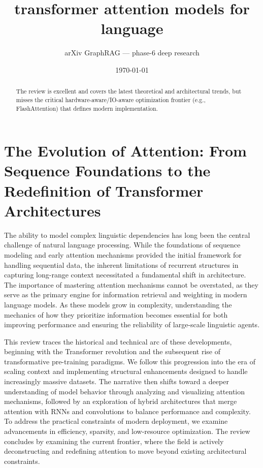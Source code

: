 \documentclass[11pt]{article}
\title{transformer attention models for language}
\author{arXiv GraphRAG --- phase-6 deep research}
\date{\today}
\begin{document}
\maketitle

\begin{abstract}
The review is excellent and covers the latest theoretical and architectural trends, but misses the critical hardware-aware/IO-aware optimization frontier (e.g., FlashAttention) that defines modern implementation.
\end{abstract}

\section{The Evolution of Attention: From Sequence Foundations to the Redefinition of Transformer Architectures}

The ability to model complex linguistic dependencies has long been the central challenge of natural language processing. While the foundations of sequence modeling and early attention mechanisms provided the initial framework for handling sequential data, the inherent limitations of recurrent structures in capturing long-range context necessitated a fundamental shift in architecture. The importance of mastering attention mechanisms cannot be overstated, as they serve as the primary engine for information retrieval and weighting in modern language models. As these models grow in complexity, understanding the mechanics of how they prioritize information becomes essential for both improving performance and ensuring the reliability of large-scale linguistic agents.

This review traces the historical and technical arc of these developments, beginning with the Transformer revolution and the subsequent rise of transformative pre-training paradigms. We follow this progression into the era of scaling context and implementing structural enhancements designed to handle increasingly massive datasets. The narrative then shifts toward a deeper understanding of model behavior through analyzing and visualizing attention mechanisms, followed by an exploration of hybrid architectures that merge attention with RNNs and convolutions to balance performance and complexity. To address the practical constraints of modern deployment, we examine advancements in efficiency, sparsity, and low-resource optimization. The review concludes by examining the current frontier, where the field is actively deconstructing and redefining attention to move beyond existing architectural constraints.
\end{document}
